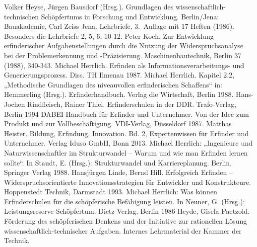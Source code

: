 \documentclass[11pt,a4paper]{article}
\begin{document}
\begin{thebibliography}{xxx}
 Volker Heyse, Jürgen Bausdorf (Hrsg.). Grundlagen des
  wissenschaftlich-technischen Schöpfertums in Forschung und Entwicklung.
  Berlin/Jena: Bauakademie, Carl Zeiss Jena. Lehrbriefe, 3.~Auflage mit 17
  Heften (1986).  Besonders die Lehrbriefe 2, 5, 6, 10-12.
 Peter Koch. Zur Entwicklung erfinderischer Aufgabenstellungen
  durch die Nutzung der Widerspruchsanalyse bei der Problemerkennung und
  -Präzisierung. Maschinenbautechnik, Berlin 37 (1988), 340-343.
 Michael Herrlich. Erfinden als Informationsverarbeitungs- und
  Generierungsprozess. Diss. TH Ilmenau 1987.
 Michael Herrlich. Kapitel 2.2, „Methodische Grundlagen des
  niveauvollen erfinderischen Schaffens“ in: Hemmerling (Hrsg.).
  Erfinderhandbuch. Verlag die Wirtschaft, Berlin 1988.
 Hans-Jochen Rindfleisch, Rainer Thiel. Erfinderschulen in der
  DDR.  Trafo-Verlag, Berlin 1994
 DABEI-Handbuch für Erfinder und Unternehmer. Von der Idee zum
  Produkt und zur Vollbeschäftigung. VDI-Verlag, Düsseldorf 1987.
 Matthas Heister. Bildung, Erfindung, Innovation. Bd. 2,
  Expertenwissen für Erfinder und Unternehmer. Verlag Iduso GmbH, Bonn 2013.
 Michael Herrlich: „Ingenieure und Naturwissenschaftler im
  Strukturwandel – Warum und wie man Erfinden lernen sollte“. In Staudt,
  E. (Hrsg.): Strukturwandel und Karriereplanung. Berlin, Springer Verlag
  1988.
 Hansjürgen Linde, Bernd Hill. Erfolgreich Erfinden –
  Widerspruchsorientierte Innovationsstrategien für Entwickler und
  Konstrukteure. Hoppenstedt Technik, Darmstadt 1993.
 Michael Herrlich: Was können Erfinderschulen für die
  schöpferische Befähigung leisten. In Neuner, G. (Hrsg.): Leistungsreserve
  Schöpfertum.  Dietz-Verlag, Berlin 1986
 Heyde, Gisela Paetzold. Förderung des schöpferischen Denkens und
  der Initiative zur rationellen Lösung wissenschaftlich-technischer Aufgaben.
  Internes Lehrmaterial der Kammer der Technik.
\end{thebibliography}
\end{document}
